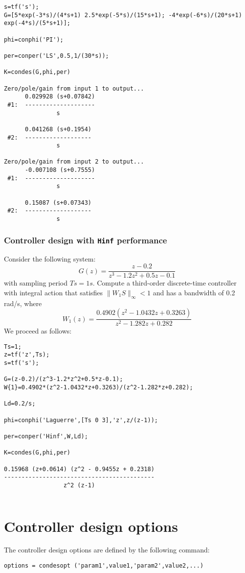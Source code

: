 \documentclass [12pt , a4paper] {report}
\begin{document}
\begin{lstlisting}
s=tf('s');
G=[5*exp(-3*s)/(4*s+1) 2.5*exp(-5*s)/(15*s+1); -4*exp(-6*s)/(20*s+1) exp(-4*s)/(5*s+1)];

phi=conphi('PI'); 

per=conper('LS',0.5,1/(30*s)); 

K=condes(G,phi,per)

Zero/pole/gain from input 1 to output...
      0.029928 (s+0.07842)
 #1:  --------------------
               s
 
      0.041268 (s+0.1954)
 #2:  -------------------
               s
 
Zero/pole/gain from input 2 to output...
      -0.007108 (s+0.7555)
 #1:  --------------------
               s
 
      0.15087 (s+0.07343)
 #2:  -------------------
               s
\end{lstlisting}

\subsubsection{Controller design with {\tt Hinf} performance}
Consider the following system:
$$G(z)=\frac{z-0.2}{z^3-1.2z^2+0.5z-0.1}$$
with sampling period $Ts=1 s$. Compute a third-order discrete-time controller with integral action that satisfies $\| W_1 S\|_\infty < 1$ and has a bandwidth of 0.2 rad/s, where
$$W_1(z)=\frac{0.4902(z^2-1.0432z+0.3263)}{z^2-1.282z+0.282}$$
We proceed as follows:
\begin{lstlisting}
Ts=1;
z=tf('z',Ts);
s=tf('s');

G=(z-0.2)/(z^3-1.2*z^2+0.5*z-0.1);
W{1}=0.4902*(z^2-1.0432*z+0.3263)/(z^2-1.282*z+0.282);

Ld=0.2/s;

phi=conphi('Laguerre',[Ts 0 3],'z',z/(z-1));

per=conper('Hinf',W,Ld);

K=condes(G,phi,per)

0.15968 (z+0.0614) (z^2 - 0.9455z + 0.2318)
-------------------------------------------
                 z^2 (z-1)


\end{lstlisting}

\section{Controller design options}

The controller design options are defined by the following command:
\begin{lstlisting}
options = condesopt ('param1',value1,'param2',value2,...)
\end{lstlisting}
\end{document}
